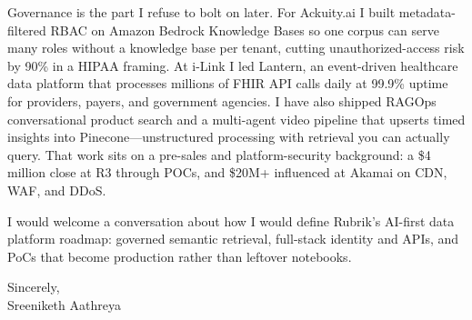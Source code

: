 \documentclass[11pt, letterpaper]{article}
\begin{document}
Governance is the part I refuse to bolt on later. For Ackuity.ai I built metadata-filtered RBAC on Amazon Bedrock Knowledge Bases so one corpus can serve many roles without a knowledge base per tenant, cutting unauthorized-access risk by 90\% in a HIPAA framing. At i-Link I led Lantern, an event-driven healthcare data platform that processes millions of FHIR API calls daily at 99.9\% uptime for providers, payers, and government agencies. I have also shipped RAGOps conversational product search and a multi-agent video pipeline that upserts timed insights into Pinecone---unstructured processing with retrieval you can actually query. That work sits on a pre-sales and platform-security background: a \$4 million close at R3 through POCs, and \$20M+ influenced at Akamai on CDN, WAF, and DDoS.

I would welcome a conversation about how I would define Rubrik's AI-first data platform roadmap: governed semantic retrieval, full-stack identity and APIs, and PoCs that become production rather than leftover notebooks.

Sincerely,\\[12pt]
Sreeniketh Aathreya
\end{document}
